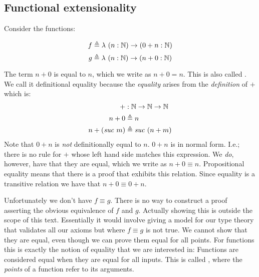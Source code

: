 \subsection{Functional extensionality}
\label{sec:functional-extensionality}%
Consider the functions:
%
\begin{multicols}{2}
  \noindent%
  \begin{equation*}%
    f \defeq \lambda\ (n \tp \bN) \to (0 + n \tp \bN)
  \end{equation*}%
  \begin{equation*}%
    g \defeq \lambda\ (n \tp \bN) \to (n + 0 \tp \bN)
  \end{equation*}%
\end{multicols}%
%
The term $n + 0$ is
 equal to $n$, which we
write as $n + 0 = n$. This is also called
.
We call it definitional equality because the \emph{equality} arises
from the \emph{definition} of $+$ which is:
%
\begin{align*}
  +           & \tp \bN \to \bN \to \bN      \\
  n + 0       & \defeq n                   \\
  n + (\suc{m}) & \defeq \suc{(n + m)}
\end{align*}
%
Note that $0 + n$ is \emph{not} definitionally equal to $n$. $0 + n$
is in normal form. I.e.; there is no rule for $+$ whose left hand side
matches this expression. We \emph{do}, however, have that they are
 equal, which we write
as $n + 0 \equiv n$. Propositional equality means that there is a
proof that exhibits this relation. Since equality is a transitive
relation we have that $n + 0 \equiv 0 + n$.

Unfortunately we don't have $f \equiv g$. There is no way to construct
a proof asserting the obvious equivalence of $f$ and $g$. Actually
showing this is outside the scope of this text. Essentially it would
involve giving a model for our type theory that validates all our
axioms but where $f \equiv g$ is not true. We cannot show that they
are equal, even though we can prove them equal for all points. For
functions this is exactly the notion of equality that we are
interested in: Functions are considered equal when they are equal for
all inputs. This is called , where the
\emph{points} of a function refer to its arguments.

